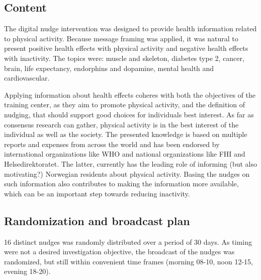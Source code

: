 \subsection{Content}
The digital nudge intervention was designed to provide health information related to physical activity. Because message framing was applied, it was natural to present positive health effects with physical activity and negative health effects with inactivity. The topics were: muscle and skeleton, diabetes type 2, cancer, brain, life expectancy, endorphins and dopamine, mental health and cardiovascular. 

Applying information about health effects coheres with both the objectives of the training center, as they aim to promote physical activity, and the definition of nudging, that should support good choices for individuals best interest. As far as consensus research can gather, physical activity is in the best interest of the individual as well as the society. 
The presented knowledge is based on multiple reports and expenses from across the world and has been endorsed by international organizations like WHO and national organizations like FHI and Helsedirektoratet. The latter, currently has the leading role of informing (but also motivating?) Norwegian residents about physical activity. Basing the nudges on such information also contributes to making the information more available, which can be an important step towards reducing inactivity.


\subsection{Randomization and broadcast plan}
16 distinct nudges was randomly distributed over a period of 30 days. As timing were not a desired investigation objective, the broadcast of the nudges was randomized, but still within convenient time frames (morning 08-10, noon 12-15, evening 18-20). 

